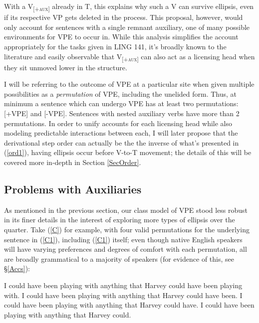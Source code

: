 \documentclass[11pt, oneside]{article}
\begin{document}
With a V\textsubscript{\textsc{[+aux]}} already in T, this explains why such a V can survive ellipsis, even if its respective VP gets deleted in the process. This proposal, however, would only account for sentences with a single remnant auxiliary, one of many possible environments for VPE to occur in. While this analysis simplifies the account appropriately for the tasks given in LING 141, it's broadly known to the literature and easily observable that V\textsubscript{\textsc{[+aux]}} can also act as a licensing head when they sit unmoved lower in the structure. 

I will be referring to the outcome of VPE at a particular site when given multiple possibilities as a \textit{permutation} of VPE, including the unelided form. Thus, at minimum a sentence which can undergo VPE has at least two permutations: [+VPE] and [-VPE]. Sentences with nested auxiliary verbs have more than 2 permutations. In order to unify accounts for each licensing head while also modeling predictable interactions between each, I will later propose that the derivational step order can actually be the the inverse of what's presented in (\ref{ord1}), having ellipsis occur before V-to-T movement; the details of this will be covered more in-depth in Section \ref{SecOrder}.


\subsection{Problems with Auxiliaries}\label{SecAuxProb}

As mentioned in the previous section, our class model of VPE stood less robust in its finer details in the interest of exploring more types of ellipsis over the quarter. Take (\ref{C}) for example, with four valid permutations for the underlying sentence in (\ref{C1}), including (\ref{C1}) itself; even though native English speakers will have varying preferences and degrees of comfort with each permutation, all are broadly grammatical to a majority of speakers (for evidence of this, see \S\ref{Accs}):
\pagebreak
\begin{exe}
\ex\label{C}\begin{xlist}
	\ex\label{C1} I could have been playing with anything that Harvey could have been playing with.
	\ex\label{C2} I could have been playing with anything that Harvey could have been.
	\ex\label{C3} I could have been playing with anything that Harvey could have.
	\ex\label{C4} I could have been playing with anything that Harvey could.
	\end{xlist}
\end{exe}
\end{document}
